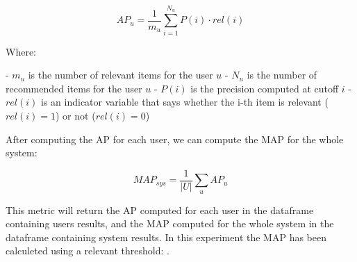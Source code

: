     \[
    AP_u = \frac{1}{m_u}\sum_{i=1}^{N_u}P(i)\cdot rel(i)
    \]

    Where:

    - $m_u$ is the number of relevant items for the user $u$
    - $N_u$ is the number of recommended items for the user $u$
    - $P(i)$ is the precision computed at cutoff $i$
    - $rel(i)$ is an indicator variable that says whether the i-th item is relevant ($rel(i)=1$) or not ($rel(i)=0$)

\hfill\break

After computing the AP for each user, we can compute the MAP for the whole system:

    \[
    MAP_{sys} = \frac{1}{|U|}\sum_{u}AP_u
    \]

\hfill\break

This metric will return the AP computed for each user in the dataframe containing users results, and the MAP
computed for the whole system in the dataframe containing system results. In this experiment the MAP has been calculeted
using a relevant threshold:
.


